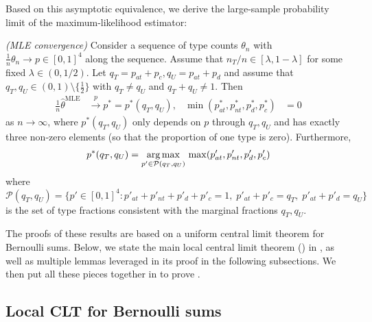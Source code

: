 \documentclass[12pt,reqno]{amsart}
\begin{document}
Based on this asymptotic equivalence, we derive the large-sample probability limit of the maximum-likelihood estimator:

\begin{prop}
\label{prop:mlefullconvergence}
\emph{(MLE convergence)}
Consider a sequence of type counts $\theta_n$ with $\tfrac{1}{n} \theta_n \rightarrow p \in [0,1]^4$ along the sequence. Assume that $n_T/n \in [\lambda, 1-\lambda]$ for some fixed $\lambda \in (0, 1/2)$. 
Let $q_T = p_{at} + p_c, q_U = p_{at} + p_d$ and assume that $q_T,q_U \in (0,1) \setminus \{\tfrac{1}{2}\}$ with $q_T \neq q_U$ and $q_T + q_U \neq 1$.
Then
\begin{align*}
    \tfrac{1}{n}\hat{\theta}^{\text{MLE}} &\xrightarrow{p} p^* = p^*(q_T,q_U),
    &
    \min(p^*_{at}, p^*_{nt}, p^*_d, p^*_c)
    &= 0
\end{align*}
as $n \rightarrow \infty$,
where $p^*(q_T,q_U)$ only depends on $p$ through $q_T,q_U$ and has exactly three non-zero elements (so that the proportion of one type is zero).
Furthermore,
\begin{align*}
p^*(q_T,q_U) = \operatorname*{arg\,max}_{p' \in \mathcal{P}(q_T,q_U)}\, \max(p'_{at}, p'_{nt}, p'_d, p'_c)
\end{align*}
where
\(
\mathcal{P}(q_T,q_U) = \{p' \in [0,1]^4 : p'_{at} {+} p'_{nt} {+} p'_d {+} p'_c {=} 1,\; p'_{at} {+} p'_c {=} q_T,\; p'_{at} {+} p'_d {=} q_U\}
\)
is the set of type fractions consistent with the marginal fractions $q_T,q_U$. 
\end{prop}

The proofs of these results are based on a uniform central limit theorem for Bernoulli sums.
Below, we state the main local central limit theorem () in , as well as multiple lemmas leveraged in its proof in the following subsections. We then put all these pieces together in  to prove .


\subsection{Local CLT for Bernoulli sums}
\label{sec:localclt}
\end{document}
